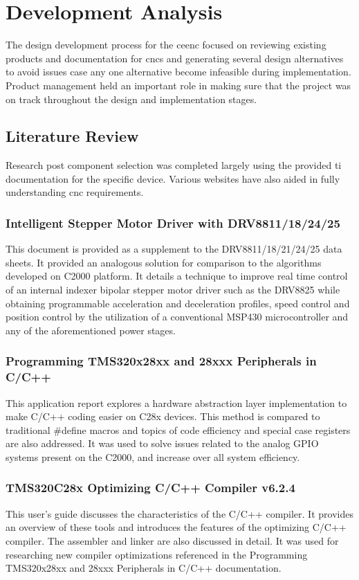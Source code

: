 \chapter{Development Analysis}

The design development process for the \gls{ceenc} focused on reviewing existing products and documentation for \gls{cnc}s and generating several design alternatives to avoid issues case any one alternative become infeasible during implementation.
Product management held an important role in making sure that the project was on track throughout the design and implementation stages.

\section{Literature Review}
Research post component selection was completed largely using the provided \gls{ti} documentation for the specific device.
Various websites have also aided in fully understanding \gls{cnc} requirements.

\subsection{Intelligent Stepper Motor Driver with DRV8811/18/24/25}
This document is provided as a supplement to the DRV8811/18/21/24/25 data sheets. 
It provided an analogous solution for comparison to the algorithms developed on C2000 platform.
It details a technique to improve real time control of an internal indexer bipolar stepper motor driver such as the DRV8825 while obtaining programmable acceleration and deceleration profiles, speed control and position control by the utilization of a conventional MSP430 microcontroller and any of the aforementioned power stages\cite{dev_intelligent}.

\subsection{Programming TMS320x28xx and 28xxx Peripherals in C/C++}
This application report explores a hardware abstraction layer implementation to make C/C++ coding easier on C28x devices. 
This method is compared to traditional \#define macros and topics of code efficiency and special case registers are also addressed\cite{dev_peripherals}.
It was used to solve issues related to the analog GPIO systems present on the C2000, and increase over all system efficiency.

\subsection{TMS320C28x Optimizing C/C++ Compiler v6.2.4}
This user's guide discusses the characteristics of the C/C++ compiler.
It provides an overview of these tools and introduces the features of the optimizing C/C++ compiler. 
The assembler and linker are also discussed in detail\cite{dev_optimize}.
It was used for researching new compiler optimizations referenced in the Programming TMS320x28xx and 28xxx Peripherals in C/C++ documentation.

